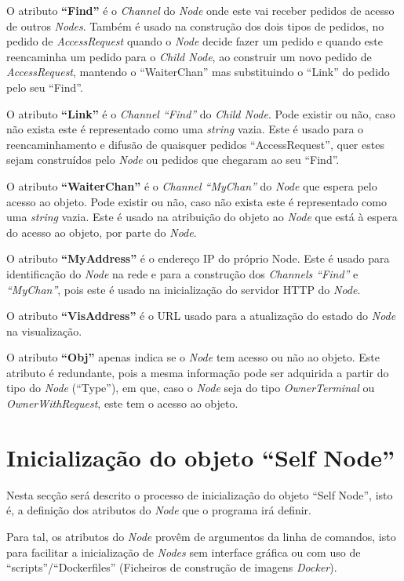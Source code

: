 O atributo \textbf{``Find''} é o \emph{Channel} do \emph{Node} onde este vai receber pedidos de acesso de outros \emph{Nodes}. 
Também é usado na construção dos dois tipos de pedidos, no pedido de \emph{AccessRequest} quando o \emph{Node} decide fazer um pedido e quando este reencaminha um pedido para o \emph{Child Node}, ao construir um novo pedido de \emph{AccessRequest}, mantendo o ``WaiterChan'' mas substituindo o ``Link'' do pedido pelo seu ``Find''.

O atributo \textbf{``Link''} é o \emph{Channel ``Find''} do \emph{Child Node}. Pode existir ou não, caso não exista este é representado como uma \emph{string} vazia.
Este é usado para o reencaminhamento e difusão de quaisquer pedidos ``AccessRequest'', quer estes sejam construídos pelo \emph{Node} ou pedidos que chegaram ao seu ``Find''.

O atributo \textbf{``WaiterChan''} é o \emph{Channel ``MyChan''} do \emph{Node} que espera pelo acesso ao objeto. Pode existir ou não, caso não exista este é representado como uma \emph{string} vazia.
Este é usado na atribuição do objeto ao \emph{Node} que está à espera do acesso ao objeto, por parte do \emph{Node}.

O atributo \textbf{``MyAddress''} é o endereço \acs{IP} do próprio Node. 
Este é usado para identificação do \emph{Node} na rede e para a construção dos \emph{Channels ``Find''} e \emph{``MyChan''},
pois este é usado na inicialização do servidor \acs{HTTP} do \emph{Node}.

O atributo \textbf{``VisAddress''} é o \acs{URL} usado para a atualização do estado do \emph{Node} na visualização.

O atributo \textbf{``Obj''} apenas indica se o \emph{Node} tem acesso ou não ao objeto.
Este atributo é redundante, pois a mesma informação pode ser adquirida a partir do tipo do \emph{Node} (``Type''), 
em que, caso o \emph{Node} seja do tipo \emph{OwnerTerminal} ou \emph{OwnerWithRequest}, este tem o acesso ao objeto.


\section{Inicialização do objeto ``Self Node''}
\label{implementacao:sec:inicializacao}

Nesta secção será descrito o processo de inicialização do objeto ``Self Node'', 
isto é, a definição dos atributos do \emph{Node} que o programa irá definir.

Para tal, os atributos do \emph{Node} provêm de argumentos da linha de comandos, isto para facilitar
a inicialização de \emph{Nodes} sem interface gráfica ou com uso de ``scripts''/``Dockerfiles'' (Ficheiros de construção de imagens \emph{Docker}).

